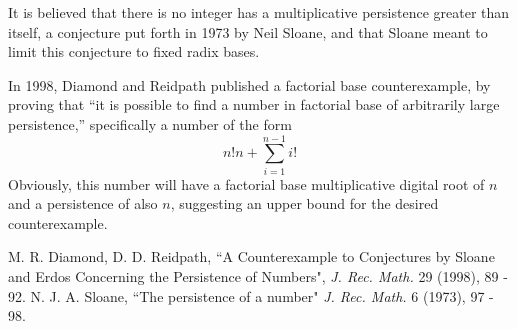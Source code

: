 \documentclass[12pt]{article}
\begin{document}
It is believed that there is no integer has a multiplicative persistence greater than itself, a conjecture put forth in 1973 by Neil Sloane, and that Sloane meant to limit this conjecture to fixed radix bases.

In 1998, Diamond and Reidpath published a factorial base counterexample, by proving that ``it is possible to find a number in factorial base of arbitrarily large persistence,'' specifically a number of the form $$n!n + \sum_{i = 1}^{n - 1} i!$$ Obviously, this number will have a factorial base multiplicative digital root of $n$ and a persistence of also $n$, suggesting an upper bound for the desired counterexample.

\begin{thebibliography}{2}
 M. R. Diamond, D. D. Reidpath, ``A Counterexample to Conjectures by Sloane and Erdos Concerning the Persistence of Numbers", {\it J. Rec. Math.} 29 (1998), 89 - 92. 
 N. J. A. Sloane, ``The persistence of a number" {\it J. Rec. Math.} 6 (1973), 97 - 98.
\end{thebibliography}
\end{document}
